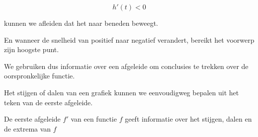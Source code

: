 \documentclass{ximera}
\begin{document}
\[
h'(t)<0
\]

kunnen we afleiden dat het naar beneden beweegt.

En wanneer de snelheid van positief naar negatief verandert, bereikt
het voorwerp zijn hoogste punt.

We gebruiken dus informatie over een afgeleide om conclusies te
trekken over de oorspronkelijke functie.

Het stijgen of dalen van een grafiek kunnen we eenvoudigweg bepalen uit het teken van de
eerste afgeleide. 
\begin{definition}
	De eerste afgeleide $f'$ van een functie $f$ geeft informatie over het stijgen, dalen en de extrema van $f$
\end{definition}
\end{document}
